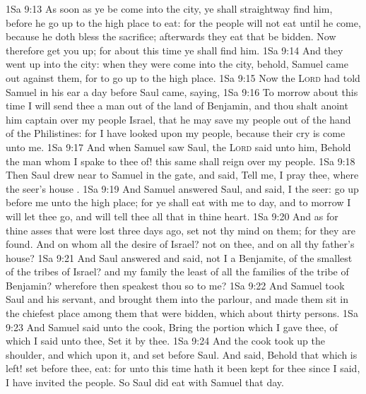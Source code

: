 \vs 1Sa 9:13 As soon as ye be come into the city, ye shall straightway find him, before he go up to the high place to eat: for the people will not eat until he come, because he doth bless the sacrifice;  afterwards they eat that be bidden. Now therefore get you up; for about this time ye shall find him.
\vs 1Sa 9:14 And they went up into the city:  when they were come into the city, behold, Samuel came out against them, for to go up to the high place.
\vs 1Sa 9:15 Now the \textsc{Lord} had told Samuel in his ear a day before Saul came, saying,
\vs 1Sa 9:16 To morrow about this time I will send thee a man out of the land of Benjamin, and thou shalt anoint him  captain over my people Israel, that he may save my people out of the hand of the Philistines: for I have looked upon my people, because their cry is come unto me.
\vs 1Sa 9:17 And when Samuel saw Saul, the \textsc{Lord} said unto him, Behold the man whom I spake to thee of! this same shall reign over my people.
\vs 1Sa 9:18 Then Saul drew near to Samuel in the gate, and said, Tell me, I pray thee, where the seer's house .
\vs 1Sa 9:19 And Samuel answered Saul, and said, I  the seer: go up before me unto the high place; for ye shall eat with me to day, and to morrow I will let thee go, and will tell thee all that  in thine heart.
\vs 1Sa 9:20 And as for thine asses that were lost three days ago, set not thy mind on them; for they are found. And on whom  all the desire of Israel?  not on thee, and on all thy father's house?
\vs 1Sa 9:21 And Saul answered and said,  not I a Benjamite, of the smallest of the tribes of Israel? and my family the least of all the families of the tribe of Benjamin? wherefore then speakest thou so to me?
\vs 1Sa 9:22 And Samuel took Saul and his servant, and brought them into the parlour, and made them sit in the chiefest place among them that were bidden, which  about thirty persons.
\vs 1Sa 9:23 And Samuel said unto the cook, Bring the portion which I gave thee, of which I said unto thee, Set it by thee.
\vs 1Sa 9:24 And the cook took up the shoulder, and  which  upon it, and set  before Saul. And  said, Behold that which is left! set  before thee,  eat: for unto this time hath it been kept for thee since I said, I have invited the people. So Saul did eat with Samuel that day.
